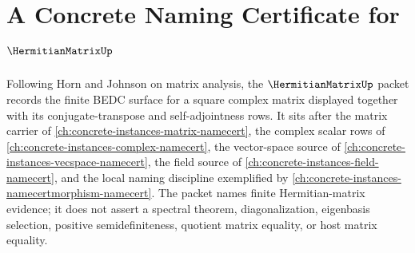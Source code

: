 \chapter{A Concrete Naming Certificate for $\HermitianMatrixUp$}
\label{ch:concrete-instances-hermitian-matrix-namecert}

Following Horn and Johnson on matrix analysis, the $\HermitianMatrixUp$ packet records the finite BEDC surface for a square complex matrix displayed together with its conjugate-transpose and self-adjointness rows. It sits after the matrix carrier of \autoref{ch:concrete-instances-matrix-namecert}, the complex scalar rows of \autoref{ch:concrete-instances-complex-namecert}, the vector-space source of \autoref{ch:concrete-instances-vecspace-namecert}, the field source of \autoref{ch:concrete-instances-field-namecert}, and the local naming discipline exemplified by \autoref{ch:concrete-instances-namecertmorphism-namecert}. The packet names finite Hermitian-matrix evidence; it does not assert a spectral theorem, diagonalization, eigenbasis selection, positive semidefiniteness, quotient matrix equality, or host matrix equality.

